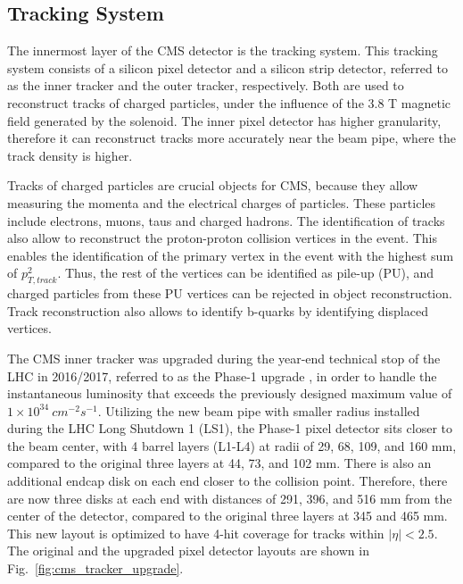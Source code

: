 \subsection{Tracking System}

The innermost layer of the CMS detector is the tracking system. This tracking system consists of a silicon pixel detector and a silicon strip detector, 
referred to as the inner tracker and the outer tracker, respectively. Both are used to reconstruct tracks of charged particles, under the influence of
the 3.8 T magnetic field generated by the solenoid. The inner pixel detector has higher granularity, therefore it can reconstruct tracks more accurately near
the beam pipe, where the track density is higher.

Tracks of charged particles are crucial objects for CMS, because they allow measuring the momenta and the electrical charges of particles. These particles include
electrons, muons, taus and charged hadrons. The identification of tracks also allow to reconstruct the proton-proton collision vertices in the event. This enables
the identification of the primary vertex in the event with the highest sum of $p_{T,track}^{2}$. Thus, the rest of the vertices can be identified as pile-up (PU),
and charged particles from these PU vertices can be rejected in object reconstruction. Track reconstruction also allows to identify b-quarks by identifying displaced
vertices. 

The CMS inner tracker was upgraded during the year-end technical stop of the LHC in 2016/2017, referred to as the Phase-1 upgrade \cite{cms:tracker_upgrade},
in order to handle the instantaneous luminosity that exceeds the previously designed maximum value of $1 \times 10^{34} \ cm^{-2} s^{-1}$. Utilizing the new 
beam pipe with smaller radius installed during the LHC Long Shutdown 1 (LS1), the Phase-1 pixel detector sits closer to the beam center, with 4 barrel layers 
(L1-L4) at radii of 29, 68, 109, and 160 mm, compared to the original three layers at 44, 73, and 102 mm. There is also an additional endcap disk on each end 
closer to the collision point. Therefore, there are now three disks at each end with distances of 291, 396, and 516 mm from the center of the detector, compared 
to the original three layers at 345 and 465 mm. This new layout is optimized to have 4-hit coverage for tracks within $|\eta| < 2.5$. The original and the upgraded
pixel detector layouts are shown in Fig.~\ref{fig:cms_tracker_upgrade}.

